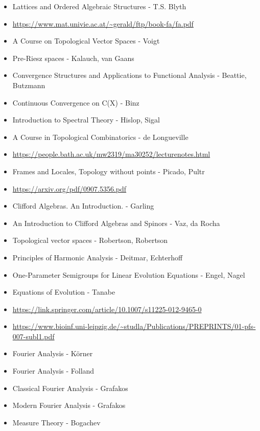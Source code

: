 \documentclass{report}
\begin{document}
\begin{itemize}
\item Lattices and Ordered Algebraic Structures - T.S. Blyth
\item \url{https://www.mat.univie.ac.at/~gerald/ftp/book-fa/fa.pdf}
\item A Course on Topological Vector Spaces - Voigt
\item Pre-Riesz spaces - Kalauch, van Gaans
\item Convergence Structures and Applications to Functional Analysis - Beattie, Butzmann
\item Continuous Convergence on C(X) - Binz
\item Introduction to Spectral Theory - Hislop, Sigal
\item A Course in Topological Combinatorics - de Longueville
\item \url{https://people.bath.ac.uk/mw2319/ma30252/lecturenotes.html}
\item Frames and Locales, Topology without points - Picado, Pultr
\item \url{https://arxiv.org/pdf/0907.5356.pdf}
\item Clifford Algebras. An Introduction. - Garling
\item An Introduction to Clifford Algebras and Spinors - Vaz, da Rocha
\item Topological vector spaces - Robertson, Robertson
\item Principles of Harmonic Analysis - Deitmar, Echterhoff
\item One-Parameter Semigroups for Linear Evolution Equations - Engel, Nagel
\item Equations of Evolution - Tanabe
\item \url{https://link.springer.com/article/10.1007/s11225-012-9465-0}
\item \url{https://www.bioinf.uni-leipzig.de/~studla/Publications/PREPRINTS/01-pfs-007-subl1.pdf}
\item Fourier Analysis - Körner
\item Fourier Analysis - Folland
\item Classical Fourier Analysis - Grafakos
\item Modern Fourier Analysis - Grafakos
\item Measure Theory - Bogachev
\end{itemize}
\end{document}
